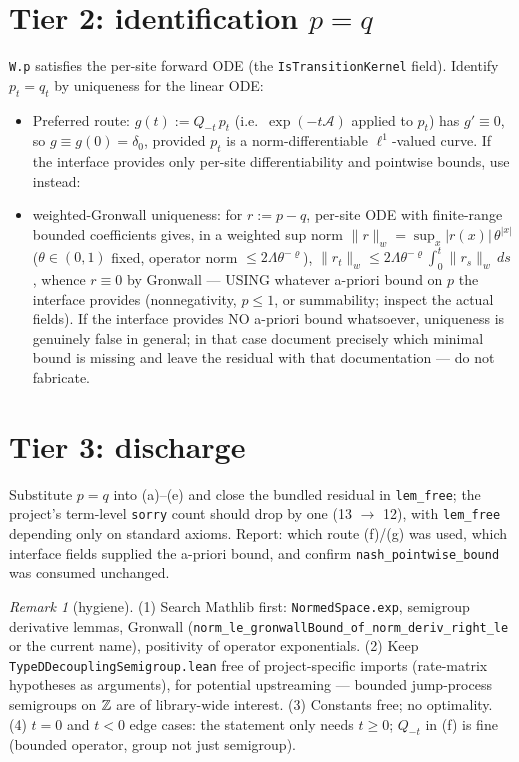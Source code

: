 \documentclass[11pt]{article}
\theoremstyle{plain}
\theoremstyle{remark}
\newtheorem{remark}{Remark}
\begin{document}
\section*{Tier 2: identification $p=q$}

\texttt{W.p} satisfies the per-site forward ODE (the \texttt{IsTransitionKernel}
field). Identify $p_t=q_t$ by uniqueness for the linear ODE:
\begin{itemize}
\item[(f)] Preferred route: $g(t):=Q_{-t}\,p_t$ (i.e.\ $\exp(-t\mathcal A)$
applied to $p_t$) has $g'\equiv0$, so $g\equiv g(0)=\delta_0$, provided $p_t$
is a norm-differentiable $\ell^1$-valued curve. If the interface provides only
per-site differentiability and pointwise bounds, use instead:
\item[(g)] weighted-Gronwall uniqueness: for $r:=p-q$, per-site ODE with
finite-range bounded coefficients gives, in a weighted sup norm
$\|r\|_w=\sup_x|r(x)|\,\theta^{|x|}$ ($\theta\in(0,1)$ fixed,
operator norm $\le2\Lambda\theta^{-\varrho}$),
$\|r_t\|_w\le2\Lambda\theta^{-\varrho}\int_0^t\|r_s\|_w\,ds$, whence $r\equiv0$
by Gronwall --- USING whatever a-priori bound on $p$ the interface provides
(nonnegativity, $p\le1$, or summability; inspect the actual fields). If the
interface provides NO a-priori bound whatsoever, uniqueness is genuinely false
in general; in that case document precisely which minimal bound is missing and
leave the residual with that documentation --- do not fabricate.
\end{itemize}

\section*{Tier 3: discharge}

Substitute $p=q$ into (a)--(e) and close the bundled residual in
\texttt{lem\_free}; the project's term-level \texttt{sorry} count should drop
by one (13 $\to$ 12), with \texttt{lem\_free} depending only on standard
axioms. Report: which route (f)/(g) was used, which interface fields supplied
the a-priori bound, and confirm \texttt{nash\_pointwise\_bound} was consumed
unchanged.

\begin{remark}[hygiene]
(1) Search Mathlib first: \texttt{NormedSpace.exp}, semigroup derivative
lemmas, Gronwall (\texttt{norm\_le\_gronwallBound\_of\_norm\_deriv\_right\_le}
or the current name), positivity of operator exponentials. (2) Keep
\texttt{TypeDDecouplingSemigroup.lean} free of project-specific imports
(rate-matrix hypotheses as arguments), for potential upstreaming --- bounded
jump-process semigroups on $\mathbb{Z}$ are of library-wide interest. (3) Constants
free; no optimality. (4) $t=0$ and $t<0$ edge cases: the statement only needs
$t\ge0$; $Q_{-t}$ in (f) is fine (bounded operator, group not just semigroup).
\end{remark}
\end{document}
